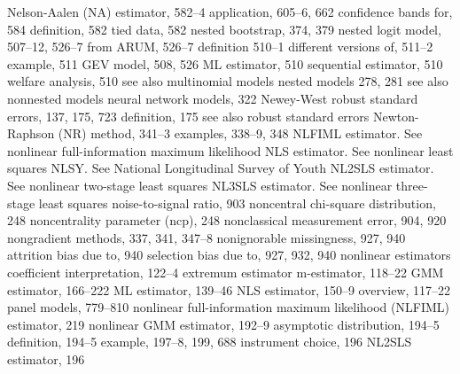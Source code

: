 Nelson-Aalen (NA) estimator, 582–4 application, 605–6, 662 confidence bands for, 584 definition, 582
tied data, 582
nested bootstrap, 374, 379
nested logit model, 507–12, 526–7
from ARUM, 526–7 definition 510–1
different versions of, 511–2 example, 511
GEV model, 508, 526 ML estimator, 510 sequential estimator, 510 welfare analysis, 510
see also multinomial models nested models 278, 281
see also nonnested models
neural network models, 322
Newey-West robust standard errors, 137, 175,
723
definition, 175
see also robust standard errors
Newton-Raphson (NR) method, 341–3 examples, 338–9, 348
NLFIML estimator. See nonlinear full-information maximum likelihood
NLS estimator. See nonlinear least squares
NLSY. See National Longitudinal Survey of Youth NL2SLS estimator. See nonlinear two-stage least
squares
NL3SLS estimator. See nonlinear three-stage least
squares
noise-to-signal ratio, 903
noncentral chi-square distribution, 248 noncentrality parameter (ncp), 248 nonclassical measurement error, 904, 920 nongradient methods, 337, 341, 347–8 nonignorable missingness, 927, 940
attrition bias due to, 940
selection bias due to, 927, 932, 940 nonlinear estimators
coefficient interpretation, 122–4 extremum estimator m-estimator, 118–22
GMM estimator, 166–222
ML estimator, 139–46 NLS estimator, 150–9 overview, 117–22 panel models, 779–810
nonlinear full-information maximum likelihood (NLFIML) estimator, 219
nonlinear GMM estimator, 192–9 asymptotic distribution, 194–5 definition, 194–5
example, 197–8, 199, 688 instrument choice, 196 NL2SLS estimator, 196

